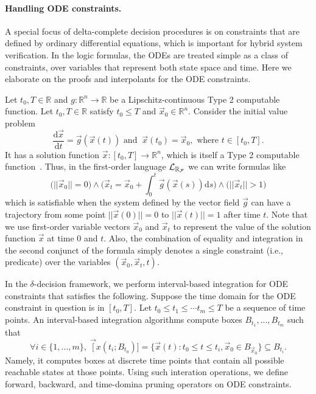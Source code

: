\paragraph{Handling ODE constraints.} A special focus of delta-complete decision procedures is on constraints that are defined by ordinary differential equations, which is important for hybrid system verification. In the logic formulas, the ODEs are treated simple as a class of constraints, over variables that represent both state space and time. Here we elaborate on the proofs and interpolants for the ODE constraints.  

 Let $t_0, T\in \mathbb{R}$ and $g:\mathbb{R}^n\rightarrow \mathbb{R}$ be a Lipschitz-continuous Type 2 computable function. Let $t_0, T\in \mathbb{R}$ satisfy $t_0\leq T$ and $\vec x_0\in \mathbb{R}^n$. Consider the initial value problem
\[\frac{\mathrm{d}\vec x}{\mathrm{d}t} = \vec g(\vec x(t))\mbox{ and } \ \vec x(t_0) = \vec x_0, \mbox{ where }t\in [t_0, T].\]
It has a solution function $\vec x: [t_0, T]\rightarrow \mathbb{R}^n$, which is itself a Type 2 computable function~\cite{CAbook}. Thus, in the first-order language $\mathcal{L}_{\mathbb{R}_{\mathcal{F}}}$ we can write formulas like
\[\Big(||\vec x_0||=0\Big) \wedge\Big( \vec x_t = \vec x_0+\int_0^t \vec g(\vec x(s))\mathrm{d}s\Big) \wedge\Big(||\vec x_t|| > 1\Big)\]
which is satisfiable when the system defined by the vector field $\vec g$ can have a trajectory from some point $||\vec x(0)||=0$ to $||\vec x(t)||=1$ after time $t$. Note that we use first-order variable vectors $\vec x_0$ and $\vec x_t$ to represent the value of the solution function $\vec x$ at time $0$ and $t$. Also, the combination of equality and integration in the second conjunct of the formula simply denotes a single constraint (i.e., predicate) over the variables $(\vec x_0, \vec x_t, t)$. 

In the $\delta$-decision framework, we perform interval-based integration for ODE constraints that satisfies the following. Suppose the time domain for the ODE constraint in question is in $[t_0,T]$. Let $t_0\leq t_1\leq \cdots t_m\leq T$ be a sequence of time points. An interval-based integration algorithms compute boxes $B_{t_1},...,B_{t_m}$ such that 
$$\forall i\in \{1,...,m\},\; \vec [x(t_i; B_{t_0})] = \{\vec x(t): t_0\leq t\leq t_i, \vec x_0\in B_{\vec x_0}\}\subseteq B_{t_i}.$$
Namely, it computes boxes at discrete time points that contain all possible reachable states at those points. Using such interation operations, we define forward, backward, and time-domina pruning operators on ODE constraints. 





